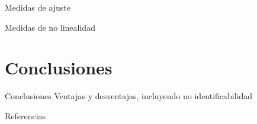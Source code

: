 \documentclass[aspectratio = 169, spanish]{beamer}
\begin{document}
\begin{frame}{Medidas de ajuste}
    
\end{frame}

\begin{frame}{Medidas de no linealidad}
    
\end{frame}


\section{Conclusiones}

\begin{frame}{Conclusiones}
    Ventajas y desventajas, incluyendo no identificabilidad
\end{frame}

\begin{frame}{Referencias}
    
\end{frame}
\end{document}
